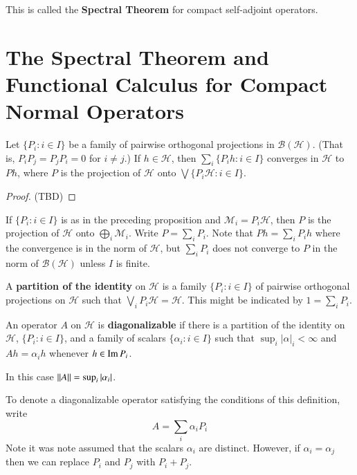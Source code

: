 This is called the \textbf{Spectral Theorem} for compact self-adjoint operators.



\section{The Spectral Theorem and Functional Calculus for Compact Normal Operators}
\label{sec:SpecThmFuncCalc}

\begin{prop}
    Let $\{P_i:i \in I\}$ be a family of pairwise orthogonal projections in $\mathscr{B}(\mathscr{H})$. (That is, $P_iP_j = P_jP_i = 0$ for $i \neq j$.) If $ h \in \mathscr{H}$, then $\sum_i\{P_ih:i \in I\}$ converges in $\mathscr{H}$ to $Ph$, where $P$ is the projection of $\mathscr{H}$ onto $\bigvee\{P_i\mathscr{H}:i \in I\}$.
\end{prop}
\begin{proof}
    (TBD)
\end{proof}

If $\{P_i:i \in I\}$ is as in the preceding proposition and $\mathscr{M}_i = P_i\mathscr{H}$, then $P$ is the projection of $\mathscr{H}$ onto $\bigoplus_i\mathscr{M}_i$. Write $P = \sum_iP_i$. Note that $Ph = \sum_iP_ih$ where the convergence is in the norm of $\mathscr{H}$, but $\sum_iP_i$ does not converge to $P$ in the norm of $\mathscr{B}(\mathscr{H})$ unless $I$ is finite.

\begin{defn}\label{Partition of Identity}
    A \textbf{partition of the identity} on $\mathscr{H}$ is a family $\{P_i: i \in I\}$ of pairwise orthogonal projections on $\mathscr{H}$ such that $\bigvee_iP_i\mathscr{H} = \mathscr{H}$. This might be indicated by $1 = \sum_iP_i$.
\end{defn}

\begin{defn}
    An operator $A$ on $\mathscr{H}$ is \textbf{diagonalizable} if there is a partition of the identity on $\mathscr{H}$, $\{P_i:i \in I\}$, and a family of scalars $\{\alpha_i:i \in I\}$ such that $\sup_i|\alpha|_i < \infty$ and $Ah = \alpha_ih$ whenever $h \in \operatorname{Im} P_i$.
\end{defn}

In this case $\left|\left| A\right|\right| = \sup_i|\alpha_i|$.

To denote a diagonalizable operator satisfying the conditions of this definition, write $$A = \sum_i\alpha_iP_i$$
Note it was note assumed that the scalars $\alpha_i$ are distinct. However, if $\alpha_i = \alpha_j$ then we can replace $P_i$ and $P_j$ with $P_i+P_j$.

